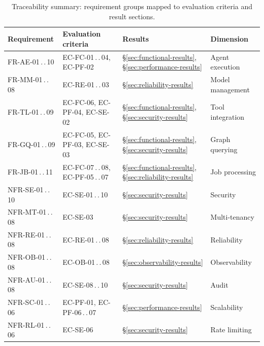 \documentclass[a4paper,noexaminfo]{sapthesis}
\begin{document}
\begin{table}[ht]
\centering
\caption{Traceability summary: requirement groups mapped to evaluation
criteria and result sections.}
\label{tab:traceability}
\small
\begin{tabularx}{\textwidth}{@{}l l l X@{}}
    \hline
    \textbf{Requirement} & \textbf{Evaluation criteria} & \textbf{Results} &
        \textbf{Dimension} \\
    \hline
    FR-AE-01\,.\,.\,10 & EC-FC-01\,.\,.\,04, EC-PF-02 &
        \S\ref{sec:functional-results}, \S\ref{sec:performance-results} &
        Agent execution \\
    FR-MM-01\,.\,.\,08 & EC-RE-01\,.\,.\,03 &
        \S\ref{sec:reliability-results} &
        Model management \\
    FR-TL-01\,.\,.\,09 & EC-FC-06, EC-PF-04, EC-SE-02 &
        \S\ref{sec:functional-results}, \S\ref{sec:security-results} &
        Tool integration \\
    FR-GQ-01\,.\,.\,09 & EC-FC-05, EC-PF-03, EC-SE-03 &
        \S\ref{sec:functional-results}, \S\ref{sec:security-results} &
        Graph querying \\
    FR-JB-01\,.\,.\,11 & EC-FC-07\,.\,.\,08, EC-PF-05\,.\,.\,07 &
        \S\ref{sec:functional-results}, \S\ref{sec:reliability-results} &
        Job processing \\
    NFR-SE-01\,.\,.\,10 & EC-SE-01\,.\,.\,10 &
        \S\ref{sec:security-results} &
        Security \\
    NFR-MT-01\,.\,.\,08 & EC-SE-03 &
        \S\ref{sec:security-results} &
        Multi-tenancy \\
    NFR-RE-01\,.\,.\,08 & EC-RE-01\,.\,.\,08 &
        \S\ref{sec:reliability-results} &
        Reliability \\
    NFR-OB-01\,.\,.\,08 & EC-OB-01\,.\,.\,08 &
        \S\ref{sec:observability-results} &
        Observability \\
    NFR-AU-01\,.\,.\,08 & EC-SE-08\,.\,.\,10 &
        \S\ref{sec:security-results} &
        Audit \\
    NFR-SC-01\,.\,.\,06 & EC-PF-01, EC-PF-06\,.\,.\,07 &
        \S\ref{sec:performance-results} &
        Scalability \\
    NFR-RL-01\,.\,.\,06 & EC-SE-06 &
        \S\ref{sec:security-results} &
        Rate limiting \\
    \hline
\end{tabularx}
\end{table}
\end{document}

